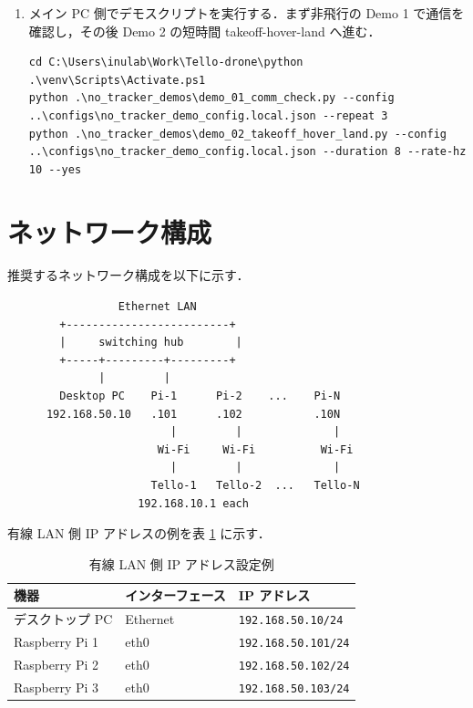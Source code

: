 \begin{enumerate}[label=\arabic*.]
  \item メイン PC 側でデモスクリプトを実行する．まず非飛行の Demo 1 で通信を確認し，その後 Demo 2 の短時間 takeoff-hover-land へ進む．
\begin{lstlisting}
cd C:\Users\inulab\Work\Tello-drone\python
.\venv\Scripts\Activate.ps1
python .\no_tracker_demos\demo_01_comm_check.py --config ..\configs\no_tracker_demo_config.local.json --repeat 3
python .\no_tracker_demos\demo_02_takeoff_hover_land.py --config ..\configs\no_tracker_demo_config.local.json --duration 8 --rate-hz 10 --yes
\end{lstlisting}
\end{enumerate}

\section{ネットワーク構成}
\label{sec:network}

推奨するネットワーク構成を以下に示す．

\begin{lstlisting}
                 Ethernet LAN
        +-------------------------+
        |     switching hub        |
        +-----+---------+---------+
              |         |         
        Desktop PC    Pi-1      Pi-2    ...    Pi-N
      192.168.50.10   .101      .102           .10N
                         |         |              |
                       Wi-Fi     Wi-Fi          Wi-Fi
                         |         |              |
                      Tello-1   Tello-2  ...   Tello-N
                    192.168.10.1 each
\end{lstlisting}

有線 LAN 側 IP アドレスの例を表 \ref{tab:ip_example} に示す．

\begin{table}[h]
  \centering
  \caption{有線 LAN 側 IP アドレス設定例}
  \label{tab:ip_example}
  \begin{tabular}{lll}
    \toprule
    機器 & インターフェース & IP アドレス \\
    \midrule
    デスクトップ PC & Ethernet & \texttt{192.168.50.10/24} \\
    Raspberry Pi 1 & eth0 & \texttt{192.168.50.101/24} \\
    Raspberry Pi 2 & eth0 & \texttt{192.168.50.102/24} \\
    Raspberry Pi 3 & eth0 & \texttt{192.168.50.103/24} \\
    \bottomrule
  \end{tabular}
\end{table}

